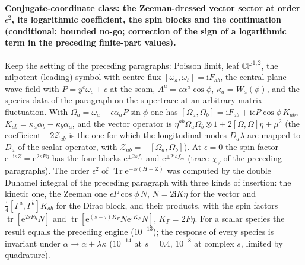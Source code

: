 \paragraph{Conjugate-coordinate class: the Zeeman-dressed vector sector at order \(\epsilon^2\), its logarithmic coefficient, the spin blocks and the continuation (conditional; bounded no-go; correction of the sign of a logarithmic term in the preceding finite-part values).}
Keep the setting of the preceding paragraphs: Poisson limit, leaf \(\mathbb{CP}^{1,2}\), the nilpotent (leading) symbol with centre flux \([\omega_a,\omega_b]=\mathrm iF_{ab}\), the central plane-wave field with \(P=y^c\omega_c+c\) at the seam, \(A^a=\epsilon\alpha^a\cos\phi\), \(\kappa_a=W_a(\phi)\), and the species data of the paragraph on the supertrace at an arbitrary matrix fluctuation. With \(\Omega_a=\omega_a-\epsilon\alpha_aP\sin\phi\) one has \([\Omega_a,\Omega_b]=\mathrm iF_{ab}+\mathrm i\epsilon P\cos\phi\,K_{ab}\), \(K_{ab}=\kappa_a\alpha_b-\kappa_b\alpha_a\), and the vector operator is \(\eta^{ab}\Omega_a\Omega_b\otimes1+2[\Omega,\Omega]\eta+\mu^2\) (the coefficient \(-2\mathcal Z_{ab}\) is the one for which the longitudinal modes \(D_a\lambda\) are mapped to \(D_a\) of the scalar operator, with \(\mathcal Z_{ab}=-[\Omega_a,\Omega_b]\)). At \(\epsilon=0\) the spin factor \(\mathrm e^{-\mathrm is Z}=\mathrm e^{2sF\eta}\) has the four blocks \(\mathrm e^{\pm2sf_e}\) and \(\mathrm e^{\pm2\mathrm isf_m}\) (trace \(\chi_V\) of the preceding paragraphs). The order \(\epsilon^2\) of \(\operatorname{Tr}\mathrm e^{-\mathrm is(H+Z)}\) was computed by the double Duhamel integral of the preceding paragraph with three kinds of insertion: the kinetic one, the Zeeman one \(\epsilon P\cos\phi\,N\), \(N=2\mathrm iK\eta\) for the vector and \(\tfrac{\mathrm i}{4}[\Gamma^a,\Gamma^b]K_{ab}\) for the Dirac block, and their products, with the spin factors \(\operatorname{tr}[\mathrm e^{2sF\eta}N]\) and \(\operatorname{tr}[\mathrm e^{(s-\tau)K_F}N\mathrm e^{\tau K_F}N]\), \(K_F=2F\eta\). For a scalar species the result equals the preceding engine (\(10^{-13}\)); the response of every species is invariant under \(\alpha\to\alpha+\lambda\kappa\) (\(10^{-14}\) at \(s=0.4\), \(10^{-8}\) at complex \(s\), limited by quadrature).

